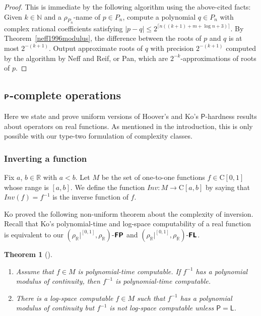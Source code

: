 \documentclass[conference]{IEEEtran}
\newcommand{\R}{\mathbb R}
\newcommand{\N}{\mathbb N}
\newcommand{\classonefont}[1]{\mathsf{#1}}
\newcommand{\classL}{\classonefont{L}}
\newcommand{\classP}{\classonefont{P}}
\newcommand{\classtwofont}[1]{\text{\bfseries \sffamily \upshape #1}}
\newcommand{\classFLtwo}{\classtwofont{FL}}
\newcommand{\classPtwo}{\classtwofont{P}}
\newcommand{\classFPtwo}{\classtwofont{FP}}
\newcommand{\rhoR}{\rho _\R}
\newcommand{\rhoRunit}{\rho _\R|^{[0,1]}}
\newcommand{\classC}{\mathrm C}
\newcommand{\OpINV}{\mathit{Inv}}
\newtheorem{theorem}{Theorem}[section]
\theoremstyle{definition}
\theoremstyle{remark}
\begin{document}
\begin{proof}
This is immediate by the following algorithm
using the above-cited facts:
Given $k \in \N$ and a $\rho_{P_n}$-name of $p \in P_n$, 
compute a polynomial $q \in {P_n}$ with complex rational coefficients
satisfying $|p - q| \le 2^{\lceil n((k+1) + m + \log n + 3)\rceil}$.
By Theorem~\ref{neff1996modulus}, the difference between 
the roots of $p$ and $q$ is at most $2^{-(k+1)}$.
Output approximate roots of $q$ with precision $2^{-(k+1)}$ 
computed by the algorithm by Neff and Reif, or Pan,
which are $2^{-k}$-approximations of roots of $p$.
\end{proof}

\subsection{$\classPtwo$-complete operations}
\label{section:P-complete}

Here we state and prove uniform versions of 
Hoover's and Ko's $\classP$-hardness results 
about operators on real functions. 
As mentioned in the introduction, 
this is only possible with our type-two formulation of complexity classes. 

\enlargethispage{4pt}

\subsubsection{Inverting a function}

Fix $a$, $b \in \R$ with $a < b$. 
Let $M$ be the set of one-to-one functions $f \in \classC[0,1]$
whose range is $[a,b]$.
We define the function $\OpINV \colon M \to \classC [a, b]$ 
by saying that $\OpINV (f) = f ^{-1}$ is the inverse function of $f$. 

Ko proved the following non-uniform theorem about the complexity of inversion.
Recall that Ko's polynomial-time and log-space computability of a real function
is equivalent to our $(\rhoRunit, \rhoR)$-$\classFPtwo$ and $(\rhoRunit, \rhoR)$-$\classFLtwo$. 

\begin{theorem}
[{\cite[Corollary 4.7 and Theorem 4.18]{ko1991complexity}}]
\label{theorem: ko inversion}
\begin{enumerate}
\item \label{enumi:ko1991-4.7}
Assume that $f \in M$ is polynomial-time computable. 
If $f^{-1}$ has a polynomial modulus of continuity, 
then $f^{-1}$ is polynomial-time computable.
\item \label{enumi:ko1991-4.18}
There is a log-space computable $f \in M$
such that $f^{-1}$ has a polynomial modulus of continuity
but $f^{-1}$ is not log-space computable
unless $\classP = \classL$.
\end{enumerate}
\end{theorem}
\end{document}
